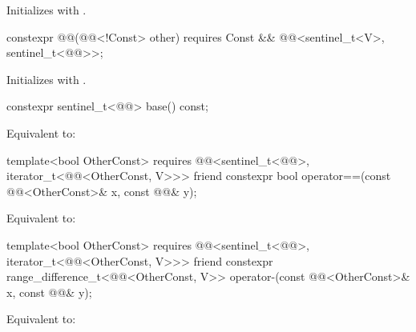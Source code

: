 \begin{itemdescr}
\pnum
\effects
Initializes  with .
\end{itemdescr}

%
\begin{itemdecl}
constexpr @@(@@<!Const> other)
  requires Const && @@<sentinel_t<V>, sentinel_t<@@>>;
\end{itemdecl}

\begin{itemdescr}
\pnum
\effects
Initializes  with .
\end{itemdescr}

%
\begin{itemdecl}
constexpr sentinel_t<@@> base() const;
\end{itemdecl}

\begin{itemdescr}
\pnum
\effects
Equivalent to: 
\end{itemdescr}

%
\begin{itemdecl}
template<bool OtherConst>
  requires @@<sentinel_t<@@>, iterator_t<@@<OtherConst, V>>>
friend constexpr bool operator==(const @@<OtherConst>& x, const @@& y);
\end{itemdecl}

\begin{itemdescr}
\pnum
\effects
Equivalent to: 
\end{itemdescr}

%
\begin{itemdecl}
template<bool OtherConst>
  requires @@<sentinel_t<@@>, iterator_t<@@<OtherConst, V>>>
friend constexpr range_difference_t<@@<OtherConst, V>>
  operator-(const @@<OtherConst>& x, const @@& y);
\end{itemdecl}

\begin{itemdescr}
\pnum
\effects
Equivalent to: 
\end{itemdescr}

